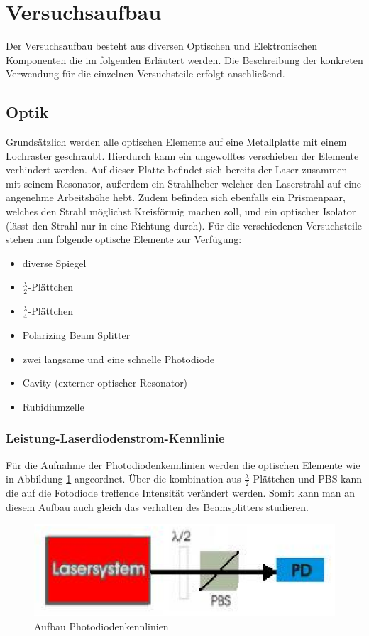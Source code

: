 \documentclass[12pt]{article}
\begin{document}
\section{Versuchsaufbau}
Der Versuchsaufbau besteht aus diversen Optischen und Elektronischen Komponenten die im folgenden Erläutert werden.
Die Beschreibung der konkreten Verwendung für die einzelnen Versuchsteile erfolgt anschließend.
\subsection{Optik}
Grundsätzlich werden alle optischen Elemente auf eine Metallplatte mit einem Lochraster geschraubt. Hierdurch kann ein ungewolltes verschieben der Elemente verhindert werden. Auf dieser Platte befindet sich bereits der Laser zusammen mit seinem Resonator, außerdem ein Strahlheber welcher den Laserstrahl auf eine angenehme Arbeitshöhe hebt. Zudem befinden sich ebenfalls ein Prismenpaar, welches den Strahl möglichst Kreisförmig machen soll, und ein optischer Isolator (lässt den Strahl nur in eine Richtung durch). Für die verschiedenen Versuchsteile stehen nun folgende optische Elemente zur Verfügung:
\begin{itemize}
 \item diverse Spiegel
 \item $\frac{\lambda}{2}$-Plättchen
 \item $\frac{\lambda}{4}$-Plättchen
 \item Polarizing Beam Splitter
 \item zwei langsame und eine schnelle Photodiode
 \item Cavity (externer optischer Resonator)
 \item Rubidiumzelle
\end{itemize}
\subsubsection{Leistung-Laserdiodenstrom-Kennlinie}
Für die Aufnahme der Photodiodenkennlinien werden die optischen Elemente wie in Abbildung \ref{skizze-pd} angeordnet.
Über die kombination aus $\frac{\lambda}{2}$-Plättchen und PBS kann die auf die Fotodiode treffende Intensität verändert werden. Somit kann man an diesem Aufbau auch gleich das verhalten des Beamsplitters studieren.
\begin{figure}[H]
 \includegraphics[width=0.9\linewidth]{pictures/eichung_der_photodiode.eps}
 \caption{Aufbau Photodiodenkennlinien}
 \label{skizze-pd}
\end{figure}
\end{document}

